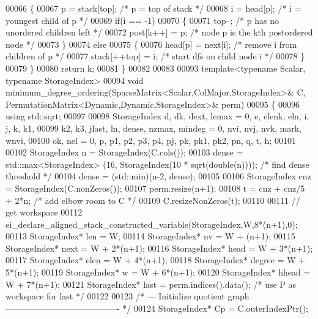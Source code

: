 \begin{DoxyCode}
00066   \{
00067     p = stack[top];           \textcolor{comment}{/* p = top of stack */}
00068     i = head[p];              \textcolor{comment}{/* i = youngest child of p */}
00069     \textcolor{keywordflow}{if}(i == -1)
00070     \{
00071       top--;                 \textcolor{comment}{/* p has no unordered children left */}
00072       post[k++] = p;        \textcolor{comment}{/* node p is the kth postordered node */}
00073     \}
00074     \textcolor{keywordflow}{else}
00075     \{
00076       head[p] = next[i];   \textcolor{comment}{/* remove i from children of p */}
00077       stack[++top] = i;     \textcolor{comment}{/* start dfs on child node i */}
00078     \}
00079   \}
00080   \textcolor{keywordflow}{return} k;
00081 \}
00082 
00083 
00093 \textcolor{keyword}{template}<\textcolor{keyword}{typename} Scalar, \textcolor{keyword}{typename} StorageIndex>
00094 \textcolor{keywordtype}{void} minimum\_degree\_ordering(SparseMatrix<Scalar,ColMajor,StorageIndex>& C, 
      PermutationMatrix<Dynamic,Dynamic,StorageIndex>& perm)
00095 \{
00096   \textcolor{keyword}{using} std::sqrt;
00097   
00098   StorageIndex d, dk, dext, lemax = 0, e, elenk, eln, i, j, k, k1,
00099                 k2, k3, jlast, ln, dense, nzmax, mindeg = 0, nvi, nvj, nvk, mark, wnvi,
00100                 ok, nel = 0, p, p1, p2, p3, p4, pj, pk, pk1, pk2, pn, q, t, h;
00101   
00102   StorageIndex n = StorageIndex(C.cols());
00103   dense = std::max<StorageIndex> (16, StorageIndex(10 * sqrt(\textcolor{keywordtype}{double}(n))));   \textcolor{comment}{/* find dense threshold */}
00104   dense = (std::min)(n-2, dense);
00105   
00106   StorageIndex cnz = StorageIndex(C.nonZeros());
00107   perm.resize(n+1);
00108   t = cnz + cnz/5 + 2*n;                 \textcolor{comment}{/* add elbow room to C */}
00109   C.resizeNonZeros(t);
00110   
00111   \textcolor{comment}{// get workspace}
00112   ei\_declare\_aligned\_stack\_constructed\_variable(StorageIndex,W,8*(n+1),0);
00113   StorageIndex* len     = W;
00114   StorageIndex* nv      = W +   (n+1);
00115   StorageIndex* next    = W + 2*(n+1);
00116   StorageIndex* head    = W + 3*(n+1);
00117   StorageIndex* elen    = W + 4*(n+1);
00118   StorageIndex* degree  = W + 5*(n+1);
00119   StorageIndex* w       = W + 6*(n+1);
00120   StorageIndex* hhead   = W + 7*(n+1);
00121   StorageIndex* last    = perm.indices().data();                              \textcolor{comment}{/* use P as workspace for
       last */}
00122   
00123   \textcolor{comment}{/* --- Initialize quotient graph ---------------------------------------- */}
00124   StorageIndex* Cp = C.outerIndexPtr();

\end{DoxyCode}
